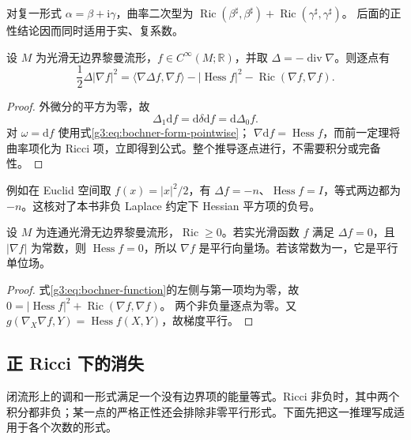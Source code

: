 对复一形式 \(\alpha=\beta+\mathrm i\gamma\)，曲率二次型为
\(\operatorname{Ric}(\beta^\sharp,\beta^\sharp)
 +\operatorname{Ric}(\gamma^\sharp,\gamma^\sharp)\)。
后面的正性结论因而同时适用于实、复系数。

\begin{theorem}\label{g3:thm:bochner-function}
	设 \(M\) 为光滑无边界黎曼流形，\(f\in C^\infty(M;\mathbb R)\)，并取
	\(\Delta=-\operatorname{div}\nabla\)。则逐点有
	\begin{equation}\label{g3:eq:bochner-function}
		\frac12\Delta|\nabla f|^2
		=\langle\nabla\Delta f,\nabla f\rangle
		  -|\operatorname{Hess}f|^2
		  -\operatorname{Ric}(\nabla f,\nabla f).
	\end{equation}
\end{theorem}
\begin{proof}
	外微分的平方为零，故
	\[
		\Delta_1\mathrm df
		=\mathrm d\delta\mathrm df
		=\mathrm d\Delta_0f.
	\]
	对 \(\omega=\mathrm df\) 使用式\eqref{g3:eq:bochner-form-pointwise}；
	\(\nabla\mathrm df=\operatorname{Hess}f\)，而前一定理将曲率项化为 Ricci 项，立即得到公式。整个推导逐点进行，不需要积分或完备性。
\end{proof}

例如在 Euclid 空间取 \(f(x)=|x|^2/2\)，有
\(\Delta f=-n\)、\(\operatorname{Hess}f=I\)，等式两边都为 \(-n\)。这核对了本书非负 Laplace 约定下 Hessian 平方项的负号。

\begin{corollary}\label{g3:cor:harmonic-unit-gradient-parallel}
	设 \(M\) 为连通光滑无边界黎曼流形，\(\operatorname{Ric}\ge0\)。若实光滑函数 \(f\) 满足
	\(\Delta f=0\)，且 \(|\nabla f|\) 为常数，则
	\(\operatorname{Hess}f=0\)，所以 \(\nabla f\) 是平行向量场。若该常数为一，它是平行单位场。
\end{corollary}
\begin{proof}
	式\eqref{g3:eq:bochner-function}的左侧与第一项均为零，故
	\(0=|\operatorname{Hess}f|^2+\operatorname{Ric}(\nabla f,\nabla f)\)。
	两个非负量逐点为零。又
	\(g(\nabla_X\nabla f,Y)=\operatorname{Hess}f(X,Y)\)，故梯度平行。
\end{proof}

\subsection{正 Ricci 下的消失}
\label{g3:subsec:1503:03}
闭流形上的调和一形式满足一个没有边界项的能量等式。Ricci 非负时，其中两个积分都非负；某一点的严格正性还会排除非零平行形式。下面先把这一推理写成适用于各个次数的形式。

